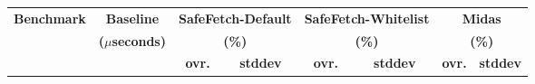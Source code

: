 \begin{tabular}{l|r|rr|rr|rr}
\multirow{3}{*}{\textbf{Benchmark}} &\multicolumn{1}{c|}{\textbf{Baseline}}& \multicolumn{2}{c|}{\textbf{SafeFetch-Default}}& \multicolumn{2}{c|}{\textbf{SafeFetch-Whitelist}}& \multicolumn{2}{c|}{\textbf{Midas}}\\
&\multicolumn{1}{c|}{\textbf{($\mu$seconds)}}& \multicolumn{2}{c|}{\textbf{(\%)}}& \multicolumn{2}{c|}{\textbf{(\%)}}& \multicolumn{2}{c|}{\textbf{(\%)}}\\
&&\multicolumn{1}{c}{\textbf{ovr.}}&\multicolumn{1}{c|}{\textbf{stddev}}&\multicolumn{1}{c}{\textbf{ovr.}}&\multicolumn{1}{c|}{\textbf{stddev}}&\multicolumn{1}{c}{\textbf{ovr.}}&\multicolumn{1}{c|}{\textbf{stddev}}\\
\hline
\end{tabular}
